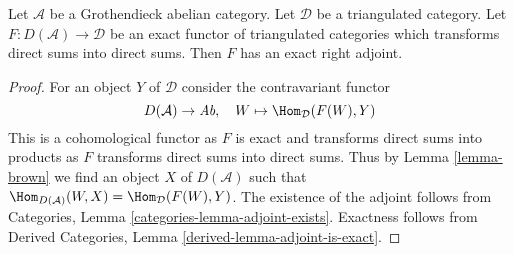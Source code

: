 \begin{proposition}
\label{proposition-brown}
Let $\mathcal{A}$ be a Grothendieck abelian category. Let $\mathcal{D}$
be a triangulated category. Let $F : D(\mathcal{A}) \to \mathcal{D}$ be an
exact functor of triangulated categories which transforms direct sums
into direct sums. Then $F$ has an exact right adjoint.
\end{proposition}

\begin{proof}
For an object $Y$ of $\mathcal{D}$ consider the contravariant functor
$$
D(\mathcal{A}) \to \textit{Ab},\quad
W \mapsto \Hom_\mathcal{D}(F(W), Y)
$$
This is a cohomological functor as $F$ is exact and transforms direct sums
into products as $F$ transforms direct sums into direct sums. Thus by
Lemma \ref{lemma-brown} we find an object $X$ of $D(\mathcal{A})$ such that
$\Hom_{D(\mathcal{A})}(W, X) = \Hom_\mathcal{D}(F(W), Y)$.
The existence of the adjoint follows from
Categories, Lemma \ref{categories-lemma-adjoint-exists}.
Exactness follows from
Derived Categories, Lemma \ref{derived-lemma-adjoint-is-exact}.
\end{proof}


















